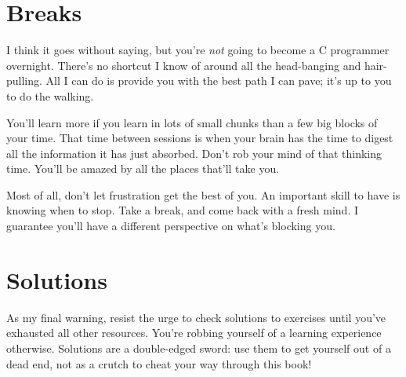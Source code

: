\section{Breaks}

I think it goes without saying, but you're \emph{not} going to become a
C programmer overnight.  There's no shortcut I know of around all the
head-banging and hair-pulling.  All I can do is provide you with the
best path I can pave; it's up to you to do the walking.

You'll learn more if you learn in lots of small chunks than a few big
blocks of your time.  That time between sessions is when your brain has
the time to digest all the information it has just absorbed.  Don't rob
your mind of that thinking time.  You'll be amazed by all the places
that'll take you.

Most of all, don't let frustration get the best of you.  An important
skill to have is knowing when to stop.  Take a break, and come back with
a fresh mind.  I guarantee you'll have a different perspective on what's
blocking you.

\section{Solutions}

As my final warning, resist the urge to check solutions to exercises
until you've exhausted all other resources.  You're robbing yourself of
a learning experience otherwise.  Solutions are a double-edged sword:
use them to get yourself out of a dead end, not as a crutch to cheat
your way through this book!
